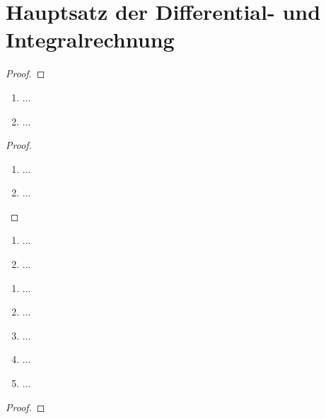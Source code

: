\documentclass[12pt]{scrreprt}
\begin{document}
\section{Hauptsatz der Differential- und Integralrechnung}
\label{}

\begin{dfn}\label{}

\end{dfn}

\begin{lem}\label{}

\end{lem}
\begin{proof}

\end{proof}

\begin{thm}\label{}
\begin{enumerate}
\item ...
\item ...
\end{enumerate}
\end{thm}
\begin{proof}
\begin{enumerate}
\item ...
\item ...
\end{enumerate}
\end{proof}

\begin{bem*}

\end{bem*}

\begin{bsp}\label{}
\begin{enumerate}
\item ...
\item ...
\end{enumerate}
\end{bsp}

\begin{bsp*}
\begin{enumerate}
\item ...
\item ...
\item ...
\item ...
\item ...
\end{enumerate}
\end{bsp*}

\begin{satz}\label{}

\end{satz}
\begin{proof}

\end{proof}
\end{document}
